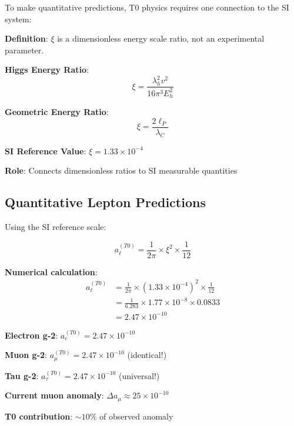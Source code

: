 \documentclass[12pt,a4paper]{article}
\newcommand{\xipar}{\xi}
\theoremstyle{definition}
\theoremstyle{remark}
\begin{document}
	To make quantitative predictions, T0 physics requires one connection to the SI system:
	
	\begin{tcolorbox}[colback=green!5!white,colframe=green!75!black,title=SI Reference Scale (Not a Parameter!)]
		\textbf{Definition}: $\xipar$ is a dimensionless energy scale ratio, not an experimental parameter.
		
		\textbf{Higgs Energy Ratio}:
		\begin{equation}
			\xipar = \frac{\lambda_h^2 v^2}{16\pi^3 E_h^2}
		\end{equation}
		
		\textbf{Geometric Energy Ratio}:
		\begin{equation}
			\xipar = \frac{2\ell_P}{\lambda_C}
		\end{equation}
		
		\textbf{SI Reference Value}: $\xipar = 1.33 \times 10^{-4}$
		
		\textbf{Role}: Connects dimensionless ratios to SI measurable quantities
	\end{tcolorbox}
	
	\subsection{Quantitative Lepton Predictions}
	
	Using the SI reference scale:
	
	\begin{equation}
		a_{\ell}^{(T0)} = \frac{1}{2\pi} \times \xipar^2 \times \frac{1}{12}
		\label{eq:quantitative_lepton_correction}
	\end{equation}
	
	\textbf{Numerical calculation}:
	\begin{align}
		a_{\ell}^{(T0)} &= \frac{1}{2\pi} \times (1.33 \times 10^{-4})^2 \times \frac{1}{12} \\
		&= \frac{1}{6.283} \times 1.77 \times 10^{-8} \times 0.0833 \\
		&= 2.47 \times 10^{-10}
	\end{align}
	
	\begin{tcolorbox}[colback=blue!5!white,colframe=blue!75!black,title=Universal Lepton Prediction]
		\textbf{Electron g-2}: $a_e^{(T0)} = 2.47 \times 10^{-10}$
		
		\textbf{Muon g-2}: $a_{\mu}^{(T0)} = 2.47 \times 10^{-10}$ (identical!)
		
		\textbf{Tau g-2}: $a_{\tau}^{(T0)} = 2.47 \times 10^{-10}$ (universal!)
		
		\textbf{Current muon anomaly}: $\Delta a_{\mu} \approx 25 \times 10^{-10}$
		
		\textbf{T0 contribution}: $\sim 10\%$ of observed anomaly
	\end{tcolorbox}
	
\end{document}
